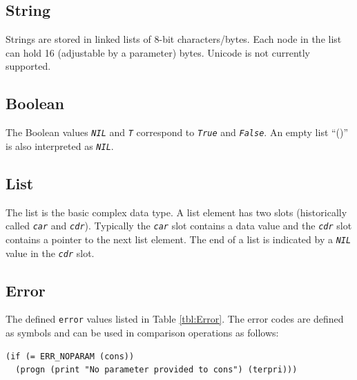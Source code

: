 \documentclass[10pt, openany]{book}
\newcommand{\constant}[1]{\emph{\texttt{#1}}}
\newcommand{\datatype}[1]{\texttt{#1}}
\begin{document}
\subsection{String}
Strings are stored in linked lists of 8-bit characters/bytes.  Each node in the list can hold 16 (adjustable by a parameter) bytes.  Unicode is not currently supported.

\subsection{Boolean}
The Boolean values \constant{NIL} and \constant{T} correspond to \constant{True} and \constant{False}.  An empty list ``()'' is also interpreted as \constant{NIL}.

\subsection{List}
The list is the basic complex data type.  A list element has two slots (historically called \constant{car} and \constant{cdr}).  Typically the \constant{car} slot contains a data value and the \constant{cdr} slot contains a pointer to the next list element.  The end of a list is indicated by a \constant{NIL} value in the \constant{cdr} slot.

\subsection{Error}
The defined \datatype{error} values listed in Table \ref{tbl:Error}.  The error codes are defined as symbols and can be used in comparison operations as follows:
\begin{lstlisting}
(if (= ERR_NOPARAM (cons))
  (progn (print "No parameter provided to cons") (terpri)))
\end{lstlisting}
\end{document}

